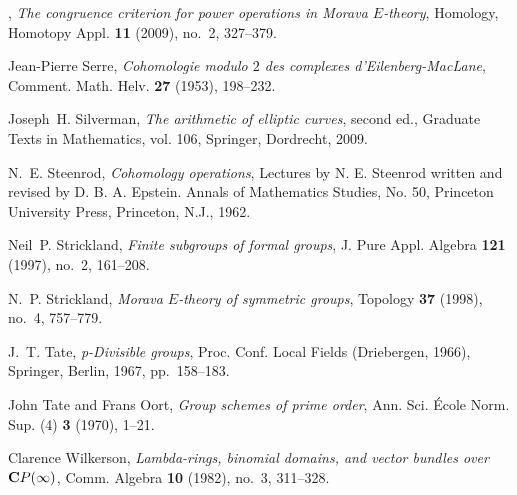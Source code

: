 \documentclass{gtpart}
\theoremstyle{definition}
\theoremstyle{remark}
\begin{document}
\begin{thebibliography}
\bysame, \emph{The congruence criterion for power operations in {M}orava
  {$E$}-theory}, Homology, Homotopy Appl. \textbf{11} (2009), no.~2, 327--379.

Jean-Pierre Serre, \emph{Cohomologie modulo {$2$} des complexes
  d'{E}ilenberg-{M}ac{L}ane}, Comment. Math. Helv. \textbf{27} (1953),
  198--232. 

Joseph~H. Silverman, \emph{The arithmetic of elliptic curves}, second ed.,
  Graduate Texts in Mathematics, vol. 106, Springer, Dordrecht, 2009.

N.~E. Steenrod, \emph{Cohomology operations}, Lectures by N. E. Steenrod
  written and revised by D. B. A. Epstein. Annals of Mathematics Studies, No.
  50, Princeton University Press, Princeton, N.J., 1962. 

Neil~P. Strickland, \emph{Finite subgroups of formal groups}, J. Pure Appl.
  Algebra \textbf{121} (1997), no.~2, 161--208. 

N.~P. Strickland, \emph{Morava {$E$}-theory of symmetric groups}, Topology
  \textbf{37} (1998), no.~4, 757--779. 

J.~T. Tate, \emph{p-{D}ivisible groups}, Proc. {C}onf. {L}ocal {F}ields
  ({D}riebergen, 1966), Springer, Berlin, 1967, pp.~158--183. 

John Tate and Frans Oort, \emph{Group schemes of prime order}, Ann. Sci.
  {\'E}cole Norm. Sup. (4) \textbf{3} (1970), 1--21. 

Clarence Wilkerson, \emph{Lambda-rings, binomial domains, and vector bundles
  over {${\bf C}P(\infty )$}}, Comm. Algebra \textbf{10} (1982), no.~3,
  311--328. 

\end{thebibliography}
\end{document}
